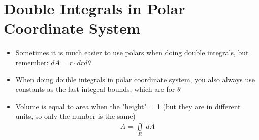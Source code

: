 \documentclass{article}
\begin{document}
\section{Double Integrals in Polar Coordinate System}
\begin{itemize}
  \item Sometimes it is much easier to use polars when doing double integrals, but remember: $dA = r\cdot drd\theta$
  \item When doing double integrals in polar coordinate system, you also always use constants as the last integral bounds, which are for $\theta$
  \item Volume is equal to area when the "height" = 1 (but they are in different units, so only the number is the same)
  \begin{align}
    A = \iint\limits_R \, dA
  \end{align}
\end{itemize}
\end{document}
